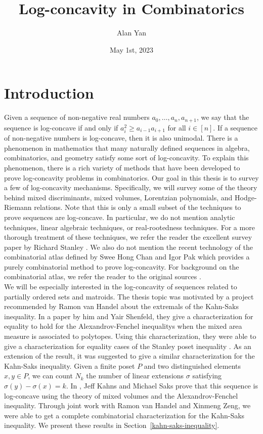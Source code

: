 \documentclass{puthesis-UG}
\author{Alan Yan}
\title{Log-concavity in Combinatorics}
\date{May 1st, 2023}
\begin{document}
\chapter*{Introduction}

Given a sequence of non-negative real numbers $a_0, \ldots, a_n, a_{n+1}$, we say that the sequence is log-concave if and only if $a_i^2 \geq a_{i-1} a_{i+1}$ for all $i \in [n]$. If a sequence of non-negative numbers is log-concave, then it is also unimodal. There is a phenomenon in mathematics that many naturally defined sequences in algebra, combinatorics, and geometry satisfy some sort of log-concavity. To explain this phenomenon, there is a rich variety of methods that have been developed to prove log-concavity problems in combinatorics. Our goal in this thesis is to survey a few of log-concavity mechanisms. Specifically, we will survey some of the theory behind mixed discriminants, mixed volumes, Lorentzian polynomials, and Hodge-Riemann relations. Note that this is only a small subset of the techniques to prove sequences are log-concave. In particular, we do not mention analytic techniques, linear algebraic techniques, or real-rootedness techniques. For a more thorough treatment of these techniques, we refer the reader the excellent survey paper by Richard Stanley \cite{Stanley1989LogConcaveAU}. We also do not mention the recent technology of the combinatorial atlas defined by Swee Hong Chan and Igor Pak which provides a purely combinatorial method to prove log-concavity. For background on the combinatorial atlas, we refer the reader to the original sources \cite{logconcave-poset-inequalities,combinatorial-atlas}. \\

We will be especially interested in the log-concavity of sequences related to partially ordered sets and matroids. The thesis topic was motivated by a project recommended by Ramon van Handel about the extremals of the Kahn-Saks inequality. In a paper by him and Yair Shenfeld, they give a characterization for equality to hold for the Alexandrov-Fenchel inequalitys when the mixed area measure is associated to polytopes. Using this characterization, they were able to give a characterization for equality cases of the Stanley poset inequality \cite{STANLEY}. As an extension of the result, it was suggested to give a similar characterization for the Kahn-Saks inequality. Given a finite poset $P$ and two distinguished elements $x, y \in P$, we can count $N_k$ the number of linear extensions $\sigma$ satisfying $\sigma (y) - \sigma (x) = k$. In \cite{balancing-poset-extensions}, Jeff Kahns and Michael Saks prove that this sequence is log-concave using the theory of mixed volumes and the Alexandrov-Fenchel inequality. Through joint work with Ramon van Handel and Xinmeng Zeng, we were able to get a complete combinatorial characterization for the Kahn-Saks inequality. We present these results in Section~\ref{kahn-saks-inequality}. \\
\end{document}
